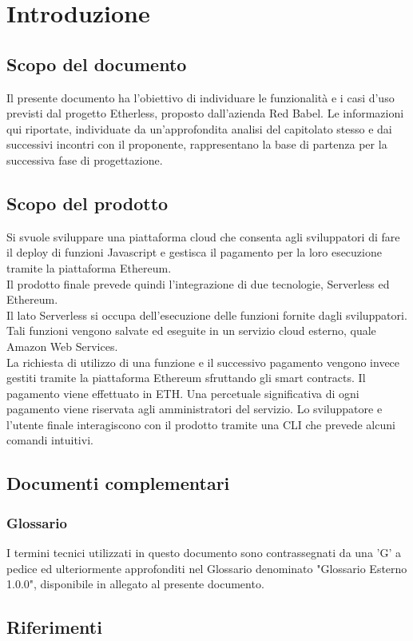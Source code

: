 \section{Introduzione}
\subsection{Scopo del documento}
Il presente documento ha l'obiettivo di individuare le funzionalità e i casi d'uso previsti dal progetto Etherless, proposto dall'azienda Red Babel. Le informazioni qui riportate, individuate da un'approfondita analisi del capitolato stesso e dai successivi incontri con il proponente, rappresentano la base di partenza per la successiva fase di progettazione.
\subsection{Scopo del prodotto}
Si svuole sviluppare una piattaforma cloud che consenta agli sviluppatori di fare il deploy di funzioni Javascript e gestisca il pagamento per la loro esecuzione tramite la piattaforma Ethereum.\\
Il prodotto finale prevede quindi l'integrazione di due tecnologie, Serverless ed Ethereum.\\
Il lato Serverless si occupa dell'esecuzione delle funzioni fornite dagli sviluppatori. Tali funzioni vengono salvate ed eseguite in un servizio cloud esterno, quale Amazon Web Services.  \\La richiesta di utilizzo di una funzione e il successivo pagamento vengono invece gestiti tramite la piattaforma Ethereum sfruttando gli smart contracts. Il pagamento viene effettuato in ETH. Una percetuale significativa di ogni pagamento viene riservata agli amministratori del servizio. 
Lo sviluppatore e l'utente finale interagiscono con il prodotto tramite una CLI che prevede alcuni comandi intuitivi.
\subsection{Documenti complementari}
\subsubsection{Glossario}
	I termini tecnici utilizzati in questo documento sono contrassegnati da una ’G’ a pedice ed ulteriormente approfonditi nel Glossario denominato "Glossario Esterno 1.0.0", disponibile in allegato al presente documento.
\subsection{Riferimenti}
